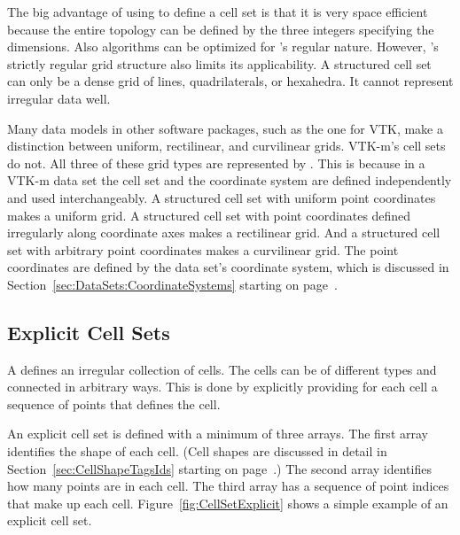 The big advantage of using  to define a cell
set is that it is very space efficient because the entire topology can be
defined by the three integers specifying the dimensions. Also algorithms
can be optimized for 's regular nature.
However, 's strictly regular grid
structure also limits its applicability. A structured cell set can only be
a dense grid of lines, quadrilaterals, or hexahedra. It cannot represent
irregular data well.

Many data models in other software packages, such as the one for VTK, make
a distinction between uniform, rectilinear, and curvilinear grids. VTK-m's
cell sets do not. All three of these grid types are represented by
. This is because in a VTK-m data set the
cell set and the coordinate system are defined independently and used
interchangeably. A structured cell set with uniform point coordinates makes
a uniform grid. A structured cell set with point coordinates defined
irregularly along coordinate axes makes a rectilinear grid. And a
structured cell set with arbitrary point coordinates makes a curvilinear
grid. The point coordinates are defined by the data set's coordinate system,
which is discussed in Section~\ref{sec:DataSets:CoordinateSystems} starting
on page~\pageref{sec:DataSets:CoordinateSystems}.


\subsection{Explicit Cell Sets}


A  defines an irregular collection of cells. The
cells can be of different types and connected in arbitrary ways. This is
done by explicitly providing for each cell a sequence of points that
defines the cell.

An explicit cell set is defined with a minimum of three arrays. The first
array identifies the shape of each cell. (Cell shapes are discussed in
detail in Section~\ref{sec:CellShapeTagsIds} starting on
page~\pageref{sec:CellShapeTagsIds}.) The second array identifies how many
points are in each cell. The third array has a sequence of point indices
that make up each cell. Figure~\ref{fig:CellSetExplicit} shows a simple
example of an explicit cell set.

